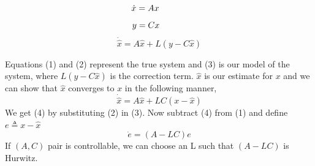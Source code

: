 \documentclass[11pt]{article}
\begin{document}
\begin{equation}
    \dot{x} = Ax  \text{ \hspace*{1cm}}
\end{equation}
\begin{equation}
    y = Cx  \text{ \hspace*{1cm}}
\end{equation}
\begin{equation}
    \dot{\hat{x}} = A \hat{x} + L(y - C\hat{x})
\end{equation}

Equations (1) and (2) represent the true system and (3) is our model of the system, where $L(y - C\hat{x})$
is the correction term. $\hat{x}$ is our estimate for $x$ and we can show that $\hat{x}$ converges to
$x$ in the following manner, 
\begin{equation}
    \dot{\hat{x}} = A \hat{x} + LC(x - \hat{x})
\end{equation}
We get (4) by substituting (2) in (3). Now subtract (4) from (1) and define $e \triangleq x - \hat{x} $
\begin{equation}
    \dot{e} = (A - LC)e
\end{equation}
If $(A, C)$ pair is controllable, we can choose an L such that $(A - LC)$ is Hurwitz. 
\end{document}
